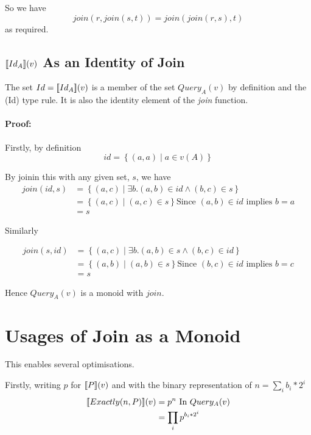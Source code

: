 \documentclass[12pt,a4paper,twoside,openright]{report}
\newcommand\mathName[1]{\textit{#1}}
\newcommand{\db}[1]{{\bf [\![}#1{\bf ]\!]}}
\newcommand{\deno}[1]{\db{#1}(v)}
\newcommand{\setComp}[2]{\left\lbrace #1 \mid #2 \right\rbrace}
\newcommand{\queryT}[1]{Query_{#1}(v)}
\begin{document}
So we have \[ join(r, join(s, t)) = join(join(r, s), t) \] as required.

\subsection{$\deno{Id_A}$ As an Identity of Join}

The set $Id = \deno{Id_A}$ is a member of the set $\queryT{A}$ by definition and the (Id) type rule. It is also the identity element of the \mathName{join} function.

\paragraph{Proof:} Firstly, by definition
\[ id = \setComp{(a, a)}{a \in v(A)}\]

By joinin this with any given set, $s$, we have
\begin{equation}
\label{LeftID}
\begin{split}
join(id, s) & = \setComp{(a, c)}{\exists b. (a, b) \in id \wedge (b, c) \in s}\\
            & = \setComp{(a, c)}{(a, c) \in s} \mbox{Since $(a, b) \in id$ implies $b = a$}\\
            & = s
\end{split}
\end{equation}

Similarly

\begin{equation}
\label{RightID}
\begin{split}
join(s, id) & = \setComp{(a, c)}{\exists b. (a, b) \in s \wedge (b, c) \in id}\\
            & = \setComp{(a, b)}{(a, b) \in s} \mbox{Since $(b, c) \in id$ implies $b = c$}\\
            & = s
\end{split}
\end{equation}



Hence $\queryT{A}$ is a monoid with $join$. 
	
\section{Usages of Join as a Monoid}
\label{exactlyOpt}
This enables several optimisations.

Firstly, writing $p$ for $\deno{P}$ and with the binary representation of $n = \sum_i{b_i * 2^{i}}$
\begin{equation}\label{ExactlyReordering}
\begin{split}
\deno{Exactly(n, P)} & = p^{n} \mbox{ In $\queryT{A}$}\\
					& = \prod_i {p^{b_i * 2^i} }
\end{split}
\end{equation}
\end{document}
